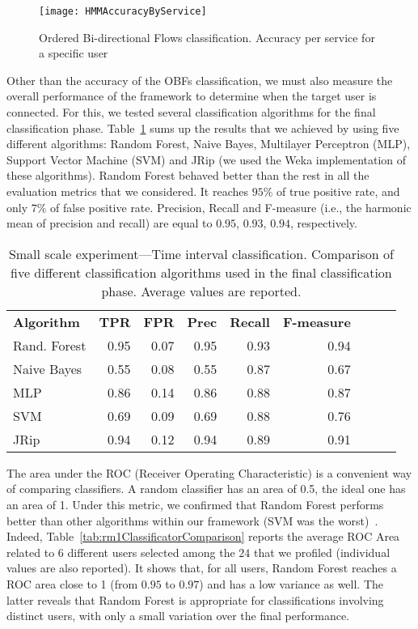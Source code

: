\documentclass[10pt,conference,compsocconf,letterpaper]{IEEEtran}
\begin{document}
\begin{figure*}	
    \centering    
    \texttt{[image: HMMAccuracyByService]}
    \caption{Ordered Bi-directional Flows classification. Accuracy per service for a specific user}
\label{fig:HMMAccuracyByService}
\end{figure*}


Other than the accuracy of the OBFs classification, we must also measure the overall performance of the framework
to determine when the target user is connected. For this, we tested several  classification algorithms for the final 
classification phase. 
Table~\ref{tab:rm1Performance} sums up the results that we achieved by using five different algorithms: Random Forest, Naive Bayes, Multilayer Perceptron (MLP), Support Vector Machine (SVM) and JRip (we used the Weka implementation of these algorithms). Random Forest behaved better than the rest in all the evaluation metrics that we considered. It reaches $95\%$ of true positive rate, and only $7\%$ of false positive rate. Precision, Recall and F-measure (i.e., the harmonic mean of precision and recall) are equal to $0.95$, $0.93$, $0.94$, respectively. 

\begin{table}[t]
\caption{Small scale experiment---Time interval classification. Comparison of five different classification algorithms used in the final classification phase.  Average values are reported. }
 \label{tab:rm1Performance}
 \begin{center}
\begin{tabular}{lrrrrrrrr}
\textbf{Algorithm} &\textbf{TPR} & \textbf{FPR} & \textbf{Prec} & \textbf{Recall} & \textbf{F-measure} \\
Rand. Forest &0.95&	0.07&	0.95&	0.93&	0.94\\
Naive Bayes &	0.55 &	0.08&	0.55&	0.87&	0.67\\
MLP &	0.86&	0.14&	0.86&	0.88&	0.87\\
SVM&	0.69&	0.09&	0.69&	0.88&	0.76\\
JRip&	0.94&	0.12&	0.94&	0.89&	0.91
\end{tabular}
\end{center}
\end{table}

The area under the ROC (Receiver Operating Characteristic) is a convenient way of comparing classifiers. A random classifier has an area of 0.5, the ideal one has an area of 1. Under this metric, we confirmed that Random Forest performs better than other algorithms within our framework (SVM was the worst)~\cite{fawcett04roc}. 
Indeed,  Table~\ref{tab:rm1ClassificatorComparison} reports the average ROC Area related to $6$ different users selected among the $24$ that we profiled (individual values are also reported). It shows that, for all users, Random Forest reaches a ROC area close to 1 (from $0.95$ to $0.97$) and has a low variance as well. 
The latter reveals that Random Forest is appropriate for classifications involving distinct users, with only a small variation over the final performance. 
\end{document}
